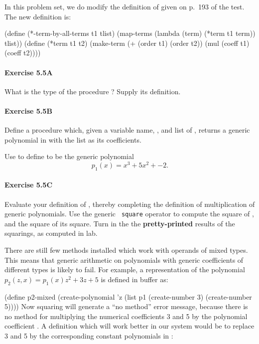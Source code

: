 In this problem set, we do modify the definition of
 given on p.\ 193 of the test.  The new
definition is:

\beginlisp
(define (*-term-by-all-terms t1 tlist)
  (map-terms
   (lambda (term) (*term t1 term))
   tlist))
\null
(define (*term t1 t2)
  (make-term
   (+ (order t1) (order t2))
   (mul (coeff t1) (coeff t2))))
\endlisp

\paragraph{Exercise 5.5A}
What is the type of the procedure ?  Supply its
definition.

\paragraph{Exercise 5.5B}
Define a procedure  which, given a
variable name, , and list of \SN, returns a generic
polynomial in  with the list as its coefficients.

Use  to define  to be the
generic polynomial \[p_1(x) = x^3 + 5x^2 + -2.\]

\paragraph{Exercise 5.5C}
Evaluate your definition of , thereby completing the
definition of multiplication of generic polynomials.  Use the generic {\tt
square} operator to compute the square of , and the square of
its square.  Turn in the the {\bf pretty-printed} results of the
squarings, as computed in lab.


\medskip

There are still few methods installed which work with operands of
mixed types.  This means that generic arithmetic on polynomials with
generic coefficients of different types is likely to fail.  For example, a
representation of the polynomial $p_{2}(z,x) = p_{1}(x)z^{2} + 3z + 5$ is
defined in buffer  as:

\beginlisp
(define p2-mixed
  (create-polynomial
   'z
   (list
    p1
    (create-number 3)
    (create-number 5))))
\endlisp
Now squaring  will generate a ``no method'' error message,
because there is no method for multiplying the numerical coefficients
3 and 5 by the polynomial coefficient .  A definition which
will work better in our system would be to replace 3 and 5 by the
corresponding constant polynomials in :

